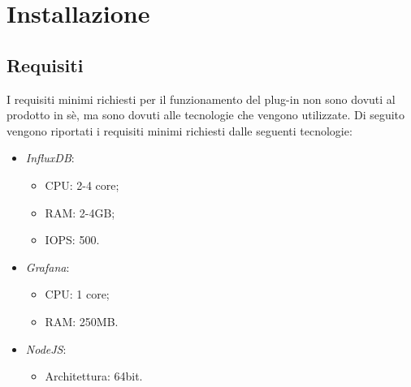\section{Installazione}\label{Installazione}

\subsection{Requisiti}\label{Requisiti}
I requisiti minimi richiesti per il funzionamento del plug-in non sono dovuti al prodotto in sè, ma sono dovuti alle tecnologie che vengono utilizzate. Di seguito vengono riportati i requisiti minimi richiesti dalle seguenti tecnologie:
\begin{itemize}
	\item \textit{InfluxDB}:
	\begin{itemize}
		\item CPU: 2-4 core;
		\item RAM: 2-4GB;
		\item IOPS: 500.
	\end{itemize}
	\item \textit{Grafana}:
	\begin{itemize}
		\item CPU: 1 core;
		\item RAM: 250MB.
	\end{itemize}
	\item \textit{NodeJS}:
	\begin{itemize}
		\item Architettura: 64bit.
	\end{itemize}
\end{itemize}

